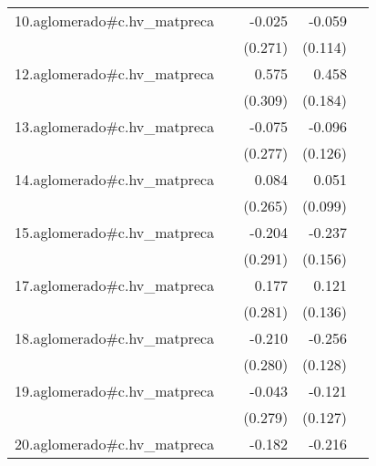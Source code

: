 {\begin{longtable}{l*{4}{D{.}{.}{-1}}}
\addlinespace
10.aglomerado#c.hv\_matpreca&                     &      -0.025         &      -0.059         &                     \\
            &                     &     (0.271)         &     (0.114)         &                     \\
\addlinespace
12.aglomerado#c.hv\_matpreca&                     &       0.575         &       0.458\sym{*}  &                     \\
            &                     &     (0.309)         &     (0.184)         &                     \\
\addlinespace
13.aglomerado#c.hv\_matpreca&                     &      -0.075         &      -0.096         &                     \\
            &                     &     (0.277)         &     (0.126)         &                     \\
\addlinespace
14.aglomerado#c.hv\_matpreca&                     &       0.084         &       0.051         &                     \\
            &                     &     (0.265)         &     (0.099)         &                     \\
\addlinespace
15.aglomerado#c.hv\_matpreca&                     &      -0.204         &      -0.237         &                     \\
            &                     &     (0.291)         &     (0.156)         &                     \\
\addlinespace
17.aglomerado#c.hv\_matpreca&                     &       0.177         &       0.121         &                     \\
            &                     &     (0.281)         &     (0.136)         &                     \\
\addlinespace
18.aglomerado#c.hv\_matpreca&                     &      -0.210         &      -0.256\sym{*}  &                     \\
            &                     &     (0.280)         &     (0.128)         &                     \\
\addlinespace
19.aglomerado#c.hv\_matpreca&                     &      -0.043         &      -0.121         &                     \\
            &                     &     (0.279)         &     (0.127)         &                     \\
\addlinespace
20.aglomerado#c.hv\_matpreca&                     &      -0.182         &      -0.216         &                     \\

\end{longtable}}
